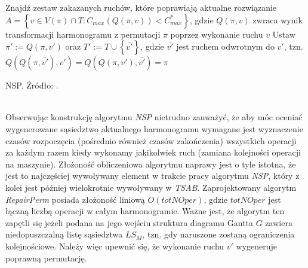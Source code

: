 \documentclass[archivemode]{mgr}
\begin{document}
\begin{algorithm}[!ht]
    Znajdź zestaw zakazanych ruchów, które poprawiają aktualne rozwiązanie $A = \left\{ v \in V(\pi) \cap T : C_{max}(Q(\pi,v)) < C^*_{max}\right\}$, gdzie $Q(\pi,v)$ zwraca wynik transformacji harmonogramu z permutacji $\pi$ poprzez wykonanie ruchu $v$\;
    Ustaw $\pi' := Q(\pi,v')$ oraz $T' := T \cup \left\{ \bar{v'} \right\}$, gdzie $\bar{v'}$ jest ruchem odwrotnym do $v'$, tzn. $Q(Q(\pi,\bar{v'}),v') = Q(Q(\pi,v'),\bar{v'}) = \pi$\;
    \caption{NSP. Źródło: \cite{Smutnicki96}.}
\end{algorithm}
\ \\Obserwując konstrukcję algorytmu \emph{NSP} nietrudno zauważyć, że aby móc oceniać wygenerowane sąsiedztwo aktualnego harmonogramu wymagane jest wyznaczenie czasów rozpoczęcia (pośrednio również czasów zakończenia) wszystkich operacji za każdym razem kiedy wykonamy jakikolwiek ruch (zamiana kolejności operacji na maszynie). Złożoność obliczeniowa algorytmu naprawy jest o tyle istotna, że jest to najczęściej wywoływany element w trakcie pracy algorytmu \emph{NSP}, który z kolei jest później wielokrotnie wywoływany w \emph{TSAB}. Zaprojektowany algorytm \emph{RepairPerm} posiada złożoność liniową $O(totNOper)$, gdzie $totNOper$ jest łączną liczbą operacji w całym harmonogramie. Ważne jest, że algorytm ten zapętli się jeżeli podana na jego wejściu struktura diagramu Gantta $G$ zawiera niedopuszczalną listę sąsiedztwa $LS_M$, tzn. gdy naruszone zostaną ograniczenia kolejnościowe. Należy więc upewnić się, że wykonanie ruchu $v'$ wygeneruje poprawną permutację.
\end{document}
